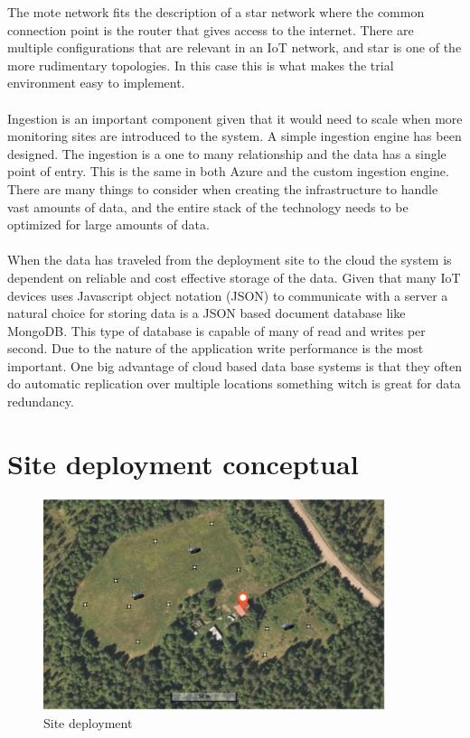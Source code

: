 \documentclass[]{uiophd}
\begin{document}
The mote network fits the description of a star network where the common connection point is the router that gives access to the internet. There are multiple configurations that are relevant in an IoT network, and star is one of the more rudimentary topologies. In this case this is what makes the trial environment easy to implement.
\\\\
Ingestion is an important component given that it would need to scale when more monitoring sites are introduced to the system. A simple ingestion engine has been designed. The ingestion is a one to many relationship and the data has a single point of entry. This is the same in both Azure and the custom ingestion engine. There are many things to consider when creating the infrastructure to handle vast amounts of data, and the entire stack of the technology needs to be optimized for large amounts of data.
\\\\
 When the data has traveled from the deployment site to the cloud the system is dependent on reliable and cost effective storage of the data. Given that many IoT devices uses Javascript object notation (JSON) to communicate with a server a natural choice for storing data is a JSON based document database like MongoDB. This type of database is capable of many of read and writes per second. Due to the nature of the application write performance is the most important. One big advantage of cloud based data base systems is that they often do automatic replication over multiple locations something witch is great for data redundancy.
 
 \section{Site deployment conceptual}
 \begin{figure}[h]
\caption{Site deployment}
\centering
\includegraphics[width=10cm]{hjemly.png}
\end{figure}
\end{document}
